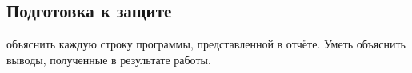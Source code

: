 { %
	\subsection{Подготовка к защите}
	\Large
	 объяснить каждую строку программы, представленной в отчёте. Уметь объяснить выводы, полученные в результате работы.
	\par
}